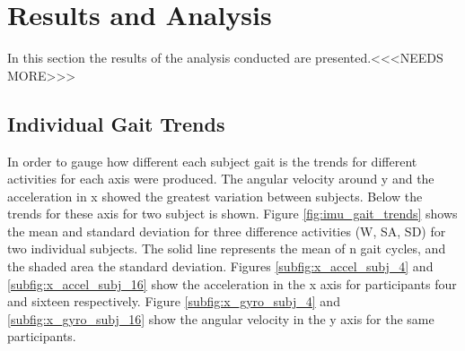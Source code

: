 \documentclass[sensors,article,submit,moreauthors,pdftex]{Definitions/mdpi}
\begin{document}
\section{Results and Analysis}
In this section the results of the analysis conducted are presented.<<<NEEDS MORE>>>

\subsection{Individual Gait Trends}
In order to gauge how different each subject gait is the trends for different activities for each axis were produced. The angular velocity around y and the acceleration in x showed the greatest variation between subjects. Below the trends for these axis for two subject is shown. Figure \ref{fig:imu_gait_trends} shows the mean and standard deviation for three difference activities (W, SA, SD) for two individual subjects. The solid line represents the mean of n gait cycles, and the shaded area the standard deviation. Figures \ref{subfig:x_accel_subj_4} and \ref{subfig:x_accel_subj_16} show the acceleration in the x axis for participants four and sixteen respectively. Figure \ref{subfig:x_gyro_subj_4} and \ref{subfig:x_gyro_subj_16} show the angular velocity in the y axis for the same participants.
\end{document}
